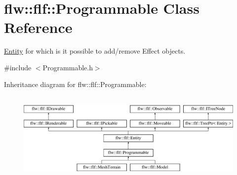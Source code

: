 \hypertarget{classflw_1_1flf_1_1Programmable}{}\section{flw\+:\+:flf\+:\+:Programmable Class Reference}
\label{classflw_1_1flf_1_1Programmable}


\hyperlink{classflw_1_1flf_1_1Entity}{Entity} for which is it possible to add/remove Effect objects.  




{\ttfamily \#include $<$Programmable.\+h$>$}

Inheritance diagram for flw\+:\+:flf\+:\+:Programmable\+:\begin{figure}[H]
\begin{center}
\leavevmode
\includegraphics[height=4.487180cm]{classflw_1_1flf_1_1Programmable}
\end{center}
\end{figure}
